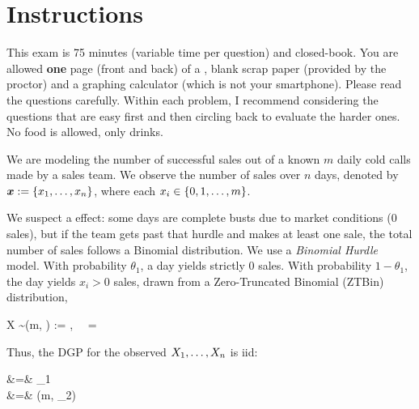 \documentclass[12pt]{article}
\begin{document}
\section*{Instructions}
This exam is 75 minutes (variable time per question) and closed-book. You are allowed \textbf{one} page (front and back) of a , blank scrap paper (provided by the proctor) and a graphing calculator (which is not your smartphone). Please read the questions carefully. Within each problem, I recommend considering the questions that are easy first and then circling back to evaluate the harder ones. No food is allowed, only drinks. %

\pagebreak

\problem We are modeling the number of successful sales out of a known $m$ daily cold calls made by a sales team. We observe the number of sales over $n$ days, denoted by $\boldsymbol{x} := \left\{x_1, \ldots, x_n\right\}$, where each $x_i \in \left\{0, 1, \dots, m\right\}$. 

We suspect a  effect: some days are complete busts due to market conditions (0 sales), but if the team gets past that hurdle and makes at least one sale, the total number of sales follows a Binomial distribution. We use a \textit{Binomial Hurdle} model. With probability $\theta_1$, a day yields strictly 0 sales. With probability $1 - \theta_1$, the day yields $x_i > 0$ sales, drawn from a Zero-Truncated Binomial (ZTBin) distribution, 

\beqn
X \sim {}(m, \theta) :=  ,~~  = 
\eeqn

\noindent Thus, the DGP for the observed $X_1, \ldots, X_n$ is iid:

\beqn
{} &=& \theta_1 \\
 &=& (m, \theta_2)
\eeqn
\end{document}
